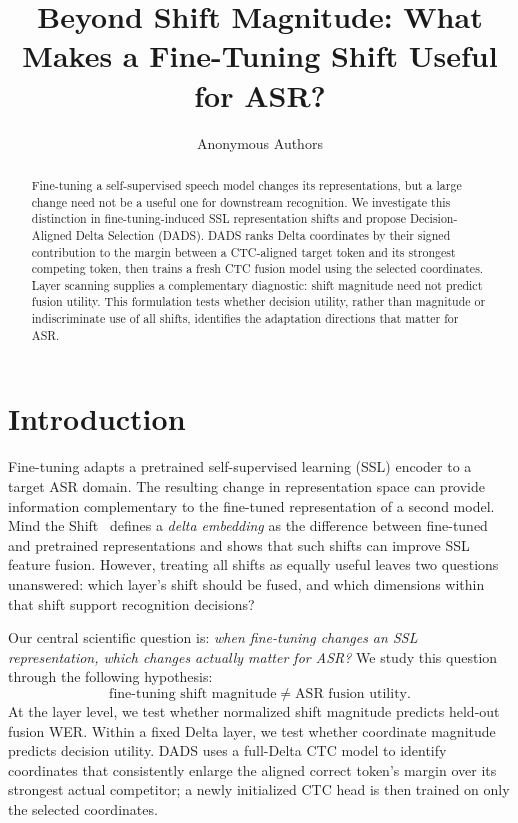 \documentclass{article}
\title{Beyond Shift Magnitude: What Makes a Fine-Tuning Shift Useful for ASR?}
\author{Anonymous Authors}
\begin{document}
\maketitle

\begin{abstract}
Fine-tuning a self-supervised speech model changes its representations, but a large change need not be a useful one for downstream recognition. We investigate this distinction in fine-tuning-induced SSL representation shifts and propose Decision-Aligned Delta Selection (DADS). DADS ranks Delta coordinates by their signed contribution to the margin between a CTC-aligned target token and its strongest competing token, then trains a fresh CTC fusion model using the selected coordinates. Layer scanning supplies a complementary diagnostic: shift magnitude need not predict fusion utility. This formulation tests whether decision utility, rather than magnitude or indiscriminate use of all shifts, identifies the adaptation directions that matter for ASR.
\end{abstract}

\section{Introduction}

Fine-tuning adapts a pretrained self-supervised learning (SSL) encoder to a target ASR domain. The resulting change in representation space can provide information complementary to the fine-tuned representation of a second model. Mind the Shift~\citep{wang2026mind} defines a \emph{delta embedding} as the difference between fine-tuned and pretrained representations and shows that such shifts can improve SSL feature fusion. However, treating all shifts as equally useful leaves two questions unanswered: which layer's shift should be fused, and which dimensions within that shift support recognition decisions?

Our central scientific question is: \emph{when fine-tuning changes an SSL representation, which changes actually matter for ASR?} We study this question through the following hypothesis:
\begin{equation}
\text{fine-tuning shift magnitude} \neq \text{ASR fusion utility}.
\end{equation}
At the layer level, we test whether normalized shift magnitude predicts held-out fusion WER. Within a fixed Delta layer, we test whether coordinate magnitude predicts decision utility. DADS uses a full-Delta CTC model to identify coordinates that consistently enlarge the aligned correct token's margin over its strongest actual competitor; a newly initialized CTC head is then trained on only the selected coordinates.
\end{document}
